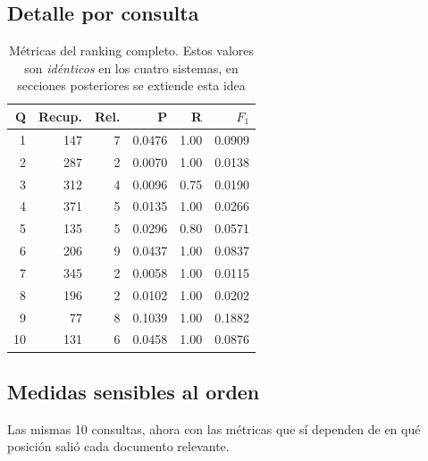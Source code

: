 \documentclass[11pt,letterpaper]{article}
\begin{document}
\subsection*{Detalle por consulta}

\begin{table}[H]
  \centering
  \begin{tabular}{rrrrrr}
    \toprule
    \textbf{Q} & \textbf{Recup.} & \textbf{Rel.} & \textbf{P}
      & \textbf{R} & \textbf{$F_1$} \\
    \midrule
     1 & 147 & 7 & 0.0476 & 1.00 & 0.0909 \\
     2 & 287 & 2 & 0.0070 & 1.00 & 0.0138 \\
     3 & 312 & 4 & 0.0096 & 0.75 & 0.0190 \\
     4 & 371 & 5 & 0.0135 & 1.00 & 0.0266 \\
     5 & 135 & 5 & 0.0296 & 0.80 & 0.0571 \\
     6 & 206 & 9 & 0.0437 & 1.00 & 0.0837 \\
     7 & 345 & 2 & 0.0058 & 1.00 & 0.0115 \\
     8 & 196 & 2 & 0.0102 & 1.00 & 0.0202 \\
     9 &  77 & 8 & 0.1039 & 1.00 & 0.1882 \\
    10 & 131 & 6 & 0.0458 & 1.00 & 0.0876 \\
    \bottomrule
  \end{tabular}
  \caption{Métricas del ranking completo. Estos valores son
    \emph{idénticos} en los cuatro sistemas, en secciones posteriores
    se extiende esta idea}
  \label{tab:porquery}
\end{table}

\subsection*{Medidas sensibles al orden}

Las mismas 10 consultas, ahora con las métricas que sí dependen de
en qué posición salió cada documento relevante.
\end{document}
